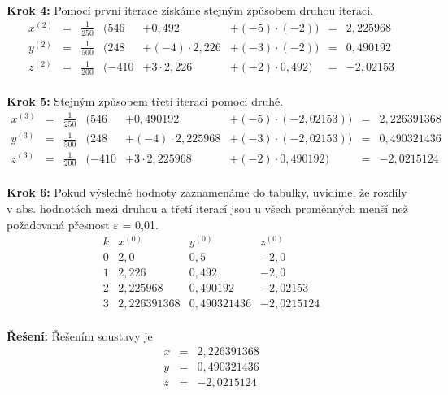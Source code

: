 \textbf{Krok 4:} Pomocí první iterace získáme stejným způsobem druhou iteraci.
\begin{displaymath}
\begin{matrix}
x^{(2)}& =& \frac{1}{250}& (546& +0,492& +(\minus5)\cdot(\minus2)) &= &2,225968\\
y^{(2)}& =& \frac{1}{500}& (248& +(\minus4)\cdot2,226& +(\minus3)\cdot(\minus2)) &= &0,490192\\
z^{(2)}& =& \frac{1}{200}& (\minus410& +3\cdot2,226& +(\minus2)\cdot0,492) &= &\minus2,02153\\
\end{matrix}
\end{displaymath}

\textbf{Krok 5:} Stejným způsobem třetí iteraci pomocí druhé.
\begin{displaymath}
\begin{matrix}
x^{(3)}& =& \frac{1}{250}& (546& +0,490192& +(\minus5)\cdot(\minus2,02153)) &= &2,226391368\\
y^{(3)}& =& \frac{1}{500}& (248& +(\minus4)\cdot2,225968& +(\minus3)\cdot(\minus2,02153)) &= &0,490321436\\
z^{(3)}& =& \frac{1}{200}& (\minus410& +3\cdot2,225968& +(\minus2)\cdot0,490192) &= &\minus2,0215124\\
\end{matrix}
\end{displaymath}

\textbf{Krok 6:} Pokud výsledné hodnoty zaznamenáme do tabulky, uvidíme, že rozdíly v abs. hodnotách mezi druhou a třetí iterací jsou u všech proměnných menší než požadovaná přesnost $\varepsilon$ = 0,01.
\begin{displaymath}
\begin{array}{r|l|l|l}
k & x^{(0)} & y^{(0)} & z^{(0)}\\
\hline
0 & 2,0 & 0,5 & \minus2,0\\
1 & 2,226 & 0,492 & \minus2,0\\
2 & 2,225968 & 0,490192 & \minus2,02153\\
3 & 2,226391368 & 0,490321436 & \minus2,0215124\\
\end{array}
\end{displaymath}

 \textbf{Řešení:} Řešením soustavy je
 \begin{displaymath}
 \begin{array}{rcl}
 x & = & 2,226391368 \\
 y & = & 0,490321436 \\
 z & = & \minus2,0215124 \\
\end{array}
\end{displaymath}